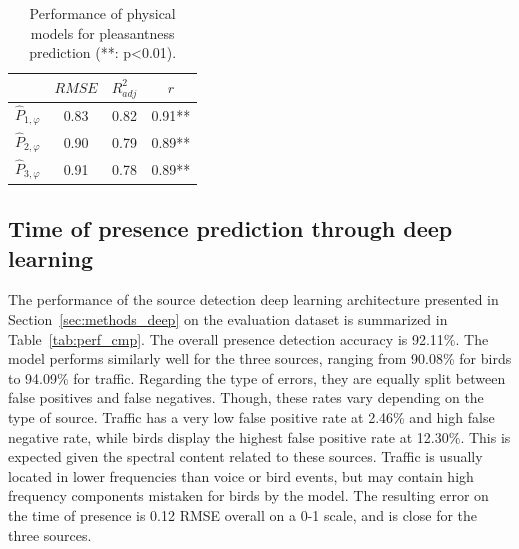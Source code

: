 \documentclass[twocolumn]{article}
\begin{document}
\begin{table}[t]
\centering
\caption{Performance of physical models for pleasantness prediction (**: p<0.01).}
\label{tab:physm}
\begin{tabular}{ c | c | c | c }
\hline
	 & $RMSE$ & $R^2_{adj}$ & $r$ \\ \hline
	$\hat P_{1, \varphi}$ & 0.83 & 0.82 & 0.91** \\
	$\hat P_{2, \varphi}$ & 0.90 & 0.79 & 0.89** \\
	$\hat P_{3, \varphi}$ & 0.91 & 0.78 & 0.89** \\ \hline
\end{tabular}
\end{table}


\subsection{Time of presence prediction through deep learning}
\label{sec:results_deep}

The performance of the source detection deep learning architecture presented in Section~\ref{sec:methods_deep} on the evaluation dataset is summarized in Table~\ref{tab:perf_cmp}. The overall presence detection accuracy is 92.11\%. The model performs similarly well for the three sources, ranging from 90.08\% for birds to 94.09\% for traffic. Regarding the type of errors, they are equally split between false positives and false negatives. Though, these rates vary depending on the type of source. Traffic has a very low false positive rate at 2.46\% and high false negative rate, while birds display the highest false positive rate at 12.30\%. This is expected given the spectral content related to these sources. Traffic is usually located in lower frequencies than voice or bird events, but may contain high frequency components mistaken for birds by the model. The resulting error on the time of presence is 0.12 RMSE overall on a 0-1 scale, and is close for the three sources.
\end{document}
